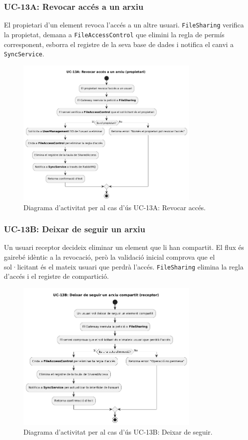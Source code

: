 \subsubsection{UC-13A: Revocar accés a un arxiu}
El propietari d'un element revoca l'accés a un altre usuari. \texttt{FileSharing} verifica la propietat, demana a \texttt{FileAccessControl} que elimini la regla de permís corresponent, esborra el registre de la seva base de dades i notifica el canvi a \texttt{SyncService}.

\begin{figure}[H]
    \centering
    \includegraphics[width=0.8\textwidth]{Figures/ad_UC13A.png}
    \caption{Diagrama d'activitat per al cas d'ús UC-13A: Revocar accés.}
    \label{fig:ad_uc13a_app}
\end{figure}

\subsubsection{UC-13B: Deixar de seguir un arxiu}
Un usuari receptor decideix eliminar un element que li han compartit. El flux és gairebé idèntic a la revocació, però la validació inicial comprova que el sol·licitant és el mateix usuari que perdrà l'accés. \texttt{FileSharing} elimina la regla d'accés i el registre de compartició.

\begin{figure}[H]
    \centering
    \includegraphics[width=0.8\textwidth]{Figures/ad_UC13B.png}
    \caption{Diagrama d'activitat per al cas d'ús UC-13B: Deixar de seguir.}
    \label{fig:ad_uc13b_app}
\end{figure}

